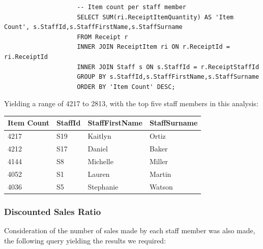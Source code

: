 \documentclass{article}
\begin{document}
                \begin{lstlisting}
                    -- Item count per staff member
                    SELECT SUM(ri.ReceiptItemQuantity) AS 'Item Count', s.StaffId,s.StaffFirstName,s.StaffSurname
                    FROM Receipt r
                    INNER JOIN ReceiptItem ri ON r.ReceiptId = ri.ReceiptId
                    INNER JOIN Staff s ON s.StaffId = r.ReceiptStaffId
                    GROUP BY s.StaffId,s.StaffFirstName,s.StaffSurname
                    ORDER BY 'Item Count' DESC;
                \end{lstlisting}

                Yielding a range of 4217 to 2813, with the top five staff members in this
                analysis:
                \begin{table}[H]
                    \centering
                    \begin{tabular}{|l|l|l|l|}
                    \hline
                    Item Count & StaffId & StaffFirstName & StaffSurname \\ \hline
                    4217       & S19     & Kaitlyn        & Ortiz        \\ \hline
                    4212       & S17     & Daniel         & Baker        \\ \hline
                    4144       & S8      & Michelle       & Miller       \\ \hline
                    4052       & S1      & Lauren         & Martin       \\ \hline
                    4036       & S5      & Stephanie      & Watson       \\ \hline
                    \end{tabular}
                \end{table}
            \subsubsection{Discounted Sales Ratio}
            Consideration of the number of sales made by each staff member was also made,
            the following query yielding the results we required:
\end{document}

